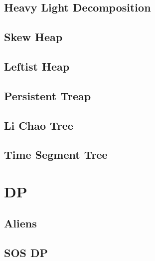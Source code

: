 \documentclass[a4paper,10pt,twocolumn,oneside]{article}
\begin{document}
\subsection{Heavy Light Decomposition}


%

\subsection{Skew Heap}


\subsection{Leftist Heap}


\subsection{Persistent Treap}


\subsection{Li Chao Tree}


\subsection{Time Segment Tree}





\section{DP}

\subsection{Aliens}


\subsection{SOS DP}

\end{document}
